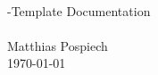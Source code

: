 \begin{titlepage}
   \mbox{}\vspace{5\baselineskip}\\
   \sffamily\huge
   \centering
   \LaTeXe{}-Template Documentation
   \rmfamily\Large
   \vspace{1\baselineskip}\\
   
   \vspace{5\baselineskip}\\
   \rmfamily\Large
   Matthias Pospiech
   \vspace{1\baselineskip}\\
   \today
\end{titlepage}
 
